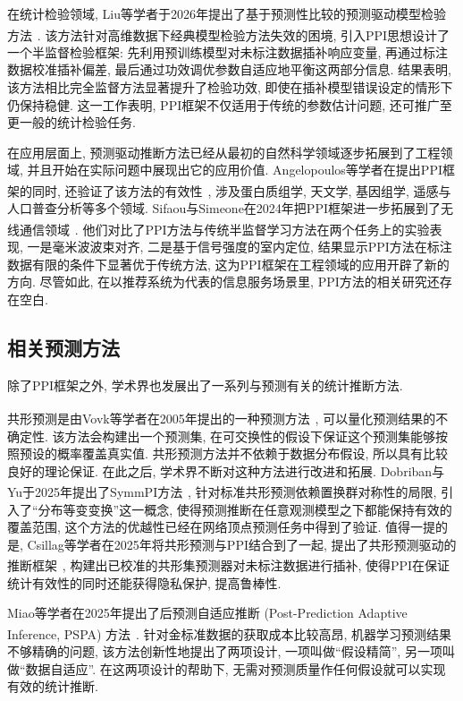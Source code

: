 \documentclass[a4paper, AutoFakeBold, UTF8]{ctexrep}
\theoremstyle{plain}
\newcommand{\upcite}[1]
{\textsuperscript{~\cite{#1}}}
\numberwithin{equation}{chapter}
\begin{document}
在统计检验领域, Liu等学者于2026年提出了基于预测性比较的预测驱动模型检验方法\upcite{Liu2026}. 该方法针对高维数据下经典模型检验方法失效的困境, 引入PPI思想设计了一个半监督检验框架: 先利用预训练模型对未标注数据插补响应变量, 再通过标注数据校准插补偏差, 最后通过功效调优参数自适应地平衡这两部分信息. 结果表明, 该方法相比完全监督方法显著提升了检验功效, 即使在插补模型错误设定的情形下仍保持稳健. 这一工作表明, PPI框架不仅适用于传统的参数估计问题, 还可推广至更一般的统计检验任务. 

在应用层面上, 预测驱动推断方法已经从最初的自然科学领域逐步拓展到了工程领域, 并且开始在实际问题中展现出它的应用价值. Angelopoulos等学者在提出PPI框架的同时, 还验证了该方法的有效性\upcite{Angelopoulos2023}, 涉及蛋白质组学, 天文学, 基因组学, 遥感与人口普查分析等多个领域. Sifaou与Simeone在2024年把PPI框架进一步拓展到了无线通信领域\upcite{Sifaou2024}. 他们对比了PPI方法与传统半监督学习方法在两个任务上的实验表现, 一是毫米波波束对齐, 二是基于信号强度的室内定位, 结果显示PPI方法在标注数据有限的条件下显著优于传统方法, 这为PPI框架在工程领域的应用开辟了新的方向. 尽管如此, 在以推荐系统为代表的信息服务场景里, PPI方法的相关研究还存在空白. 

\subsection{相关预测方法}

除了PPI框架之外, 学术界也发展出了一系列与预测有关的统计推断方法. 

共形预测是由Vovk等学者在2005年提出的一种预测方法\upcite{Vovk2005}, 可以量化预测结果的不确定性. 该方法会构建出一个预测集, 在可交换性的假设下保证这个预测集能够按照预设的概率覆盖真实值. 共形预测方法并不依赖于数据分布假设, 所以具有比较良好的理论保证. 在此之后, 学术界不断对这种方法进行改进和拓展. Dobriban与Yu于2025年提出了SymmPI方法\upcite{Dobriban2025}, 针对标准共形预测依赖置换群对称性的局限, 引入了``分布等变变换''这一概念, 使得预测推断在任意观测模型之下都能保持有效的覆盖范围, 这个方法的优越性已经在网络顶点预测任务中得到了验证. 值得一提的是, Csillag等学者在2025年将共形预测与PPI结合到了一起, 提出了共形预测驱动的推断框架\upcite{Csillag2025}, 构建出已校准的共形集预测器对未标注数据进行插补, 使得PPI在保证统计有效性的同时还能获得隐私保护, 提高鲁棒性. 

Miao等学者在2025年提出了后预测自适应推断 (Post-Prediction Adaptive Inference, PSPA) 方法\upcite{Miao2025}. 针对金标准数据的获取成本比较高昂, 机器学习预测结果不够精确的问题, 该方法创新性地提出了两项设计, 一项叫做``假设精简'', 另一项叫做``数据自适应''. 在这两项设计的帮助下, 无需对预测质量作任何假设就可以实现有效的统计推断. 
\end{document}
